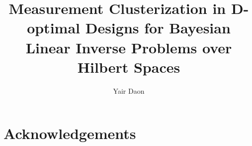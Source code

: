 \documentclass{ws-m3as}
\begin{document}

%
\catchline{}{}{}{}{}
%

\title{Measurement Clusterization in D-optimal Designs for Bayesian
  Linear Inverse Problems over Hilbert Spaces}

\author{Yair Daon}

\address{Azrieli Faculty of Medicine, Bar-Ilan University, Safed, Israel\\
yair.daon@gmail.com}

\maketitle

\begin{history}
\end{history}

\begin{abstract}
  
\end{abstract}











\section{Acknowledgements}






\end{document}
